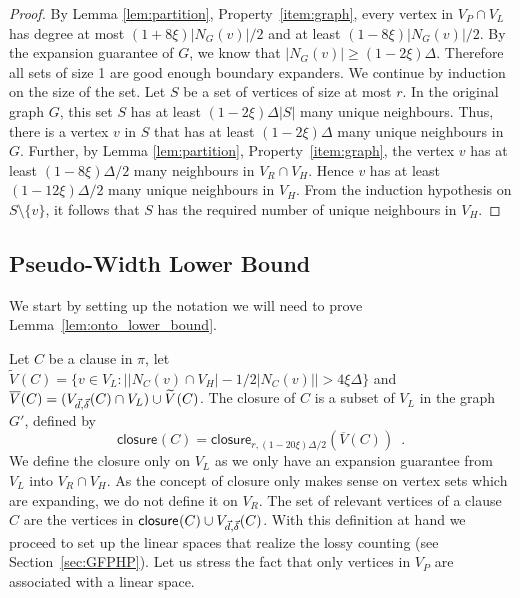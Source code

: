 \documentclass{theoretics}
\providecommand{\abs}[1]{\lvert#1\rvert}
\providecommand{\Abs}[1]{\bigl\lvert#1\bigr\rvert}
\newcommand{\set}[1]{\{ #1 \}}
\newcommand{\setdescr}[3][\mid]{\set{ #2 #1 #3 }}
\newcommand{\setsize}[1]{\lvert#1\rvert}
\newcommand{\eqperiod}{\enspace .}
\newcommand{\refsec}[1]{Section~\ref{#1}}
\newcommand{\refpi}{\pi}
\newcommand{\neigh}[2][]{N_{{#1}}(#2)}
\newcommand{\diff}{\xi}
\newcommand{\GdegMax}{\Delta}
\newcommand{\gdegmax}{\GdegMax}
\newcommand{\V}[1][]{V_{#1}}
\newcommand{\Vl}{\V[L]}
\newcommand{\Vr}{\V[R]}
\newcommand{\Vp}{\V[P]}
\newcommand{\Vh}{\V[H]}
\newcommand{\Gprime}{G'}
\newcommand{\GprimeConstantDeg}{8}
\newcommand{\GprimeConstantExp}{12}
\newcommand{\Vbad}[2][]{\widetilde V^{#1}(#2)}
\newcommand{\VbadThick}[1]{\overline V(#1)}
\newcommand{\vecthr}{\vec{d}}
\newcommand{\vecadv}{\vec{\delta}}
\newcommand{\Vthick}[1]{\ensuremath V_{\vecthr,\vecadv}(#1)}
\newcommand{\PSEUDOWIDTH}{Pseudo-Width\xspace}
\newcommand{\closure}[2][]{\mathsf{closure}_{{#1}}(#2)}
\newcommand{\squeezesubsection}[1]{\subsection{#1}}
\numberwithin{equation}{section}
\begin{document}
\begin{proof}
  By Lemma \ref{lem:partition}, Property~\ref{item:graph}, every vertex in $\Vp\cap \Vl$ 
  has degree at most
  $(1 + \GprimeConstantDeg \diff) \setsize{\neigh[G]{v}}/2$ and at least 
  $(1 - \GprimeConstantDeg \diff) \setsize{\neigh[G]{v}}/2$.
  By the expansion guarantee of $G$, we know that 
  $\setsize{\neigh[G]{v}} \ge (1 - 2\diff) \GdegMax$.
  Therefore all sets of size 1 are good enough boundary expanders. 
  We continue by induction
  on the size of the set. Let $S$ be a set of vertices of size at most $r$. 
  In the original graph $G$,
  this set $S$ has at least $(1 - 2\diff) \GdegMax \abs{S}$ many unique 
  neighbours. Thus, there is a
  vertex $v$ in $S$ that has at least $(1 - 2\diff) \GdegMax$ many unique 
  neighbours in $G$. Further,
  by Lemma \ref{lem:partition}, Property~\ref{item:graph}, the vertex $v$ has at least 
  $(1 - \GprimeConstantDeg \diff) \GdegMax/2$
  many neighbours
  in $\Vr \cap \Vh$. Hence $v$ has at least 
  $(1 - \GprimeConstantExp \diff) \GdegMax/2$
  many unique neighbours in $\Vh$. From the induction 
  hypothesis on $S\setminus\set{v}$, it follows that $S$
  has the required number of unique neighbours in $\Vh$.
\end{proof}
 
\squeezesubsection{\PSEUDOWIDTH Lower Bound}
\label{sec:onto_lower_bound}

We start by setting up the notation we will need to prove 
Lemma~\ref{lem:onto_lower_bound}.

Let $C$ be a clause in $\refpi$, let
 $\Vbad{C} = \setdescr[:]{v \in \Vl }{
			\Abs{ \abs{ \neigh[C]{v} \cap \Vh } - 
			1/2\abs{ \neigh[C]{v} } } >
			4 \diff \GdegMax} $
and $\VbadThick{C} = (\Vthick{C} \cap \Vl) \cup \Vbad{C}$.
The closure of $C$ is a subset of $\Vl$
in the graph $\Gprime$, defined by
\begin{equation}
    \closure{C} = \closure[r, (1 - 20\diff) \gdegmax / 2]{\VbadThick{C}} 
    \eqperiod
\end{equation}
We define the closure only on $\Vl$ as we only have an expansion guarantee
from $\Vl$ into $\Vr \cap \Vh$. As the concept of closure only makes sense
on vertex sets which are expanding, we do not define it on $\Vr$.
The set of relevant vertices of a clause $C$ are the vertices in
$\closure{C} \cup \Vthick{C}$.
With this definition at
hand we proceed to set up the linear spaces that realize the lossy counting 
(see \refsec{sec:GFPHP}). Let us stress the fact that only vertices
in $\Vp$ are associated with a linear space.
\end{document}
